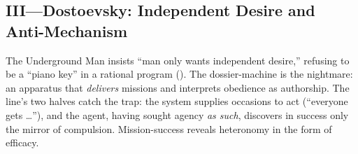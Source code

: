 \subsection*{III—Dostoevsky: Independent Desire and Anti-Mechanism}
\label{ssec:iii-dostoevsky}
The Underground Man insists “man only wants independent desire,” refusing to be a “piano key” in a rational program (\parencite[pp.~115, 129--131]{DostoevskyNFU1994}). The dossier-machine is the nightmare: an apparatus that \emph{delivers} missions and interprets obedience as authorship. The line’s two halves catch the trap: the system supplies occasions to act (“everyone gets …”), and the agent, having sought agency \emph{as such}, discovers in success only the mirror of compulsion. Mission-success reveals heteronomy in the form of efficacy.
